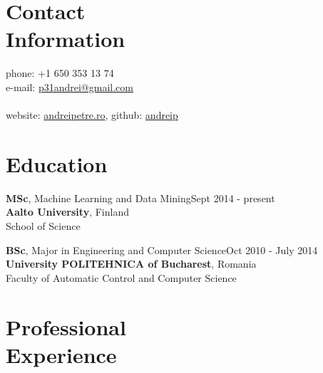 \documentclass[margin,line]{resume}
\begin{document}
\begin{resume}

    \section{\mysidestyle Contact\\Information}

    phone: +1 650 353 13 74              \\
    e-mail:  \href{mailto:p31andrei@gmail.com}{p31andrei@gmail.com}  \vspace{0mm}\\\vspace{-4.5mm}\\%
    website: \href{http://andreipetre.ro}{andreipetre.ro}, github: \href{https://github.com/andreip/}{andreip}

    \section{\mysidestyle Education}

    \textbf{MSc}, Machine Learning and Data Mining\hfill Sept 2014 - present\\
    \textbf{Aalto University}, Finland\\
    School of Science

    \textbf{BSc}, Major in Engineering and Computer Science\hfill Oct 2010 - July 2014\\
    \textbf{University POLITEHNICA of Bucharest}, Romania\\
    Faculty of Automatic Control and Computer Science

    \section{\mysidestyle Professional\\Experience}


\end{resume}
\end{document}
